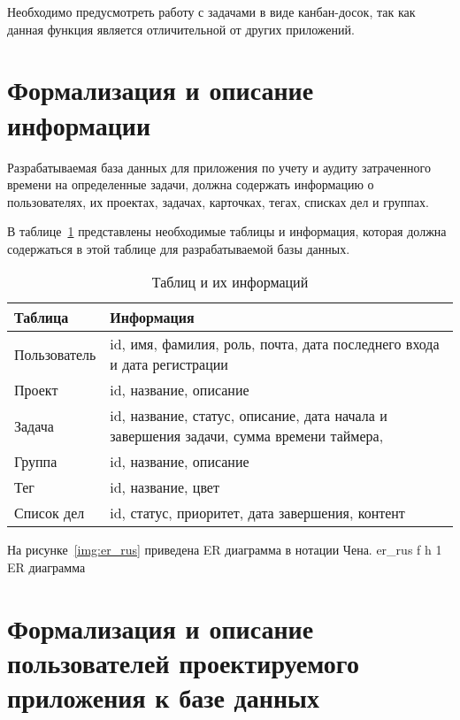 Необходимо предусмотреть работу с задачами в виде канбан-досок, так как данная функция является отличительной от других приложений.

\section{Формализация и описание информации}
 
Разрабатываемая база данных для приложения по учету и аудиту затраченного времени на определенные задачи, должна содержать информацию о пользователях, их проектах, задачах, карточках, тегах, списках дел и группах. 

В таблице~\ref{tab:er} представлены необходимые таблицы и информация, которая должна содержаться в этой таблице для разрабатываемой базы данных.

\begin{table}[H]
	\centering
	\caption{Таблиц и их информаций}
	\label{tab:er}
	\begin{tabularx}{\textwidth}{|l|X|}
		\hline
		\textbf{Таблица} & \textbf{Информация} \\ \hline
		Пользователь      & id, имя, фамилия, роль, почта, дата последнего входа и дата регистрации    \\ \hline
		Проект            & id, название, описание  \\ \hline
		Задача            & id, название, статус, описание, дата начала и завершения задачи, сумма времени таймера, \\ \hline
		Группа            & id, название, описание  \\ \hline
		Тег               & id, название, цвет  \\ \hline
		Список дел        & id, статус, приоритет, дата завершения, контент \\ \hline
	\end{tabularx}
\end{table}
\clearpage

На рисунке~\ref{img:er_rus} приведена ER диаграмма в нотации Чена.
{er_rus} %
{f} %
{h} %
{1\textwidth} %
{ER диаграмма} %

\clearpage 
\section{Формализация и описание пользователей проектируемого приложения к базе данных}

